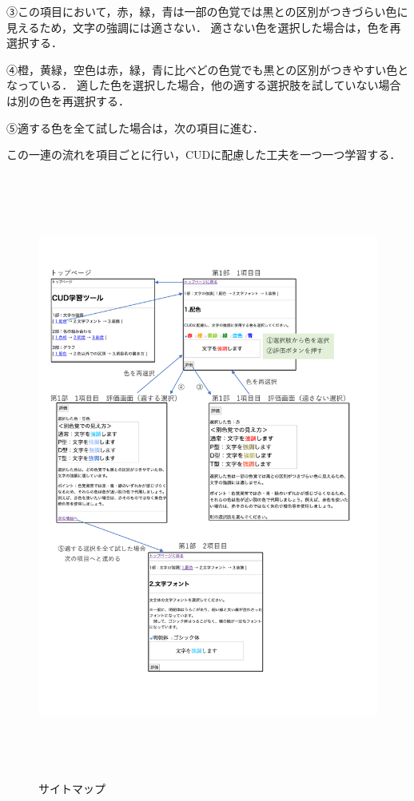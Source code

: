 ③この項目において，赤，緑，青は一部の色覚では黒との区別がつきづらい色に見えるため，文字の強調には適さない．
適さない色を選択した場合は，色を再選択する．

④橙，黄緑，空色は赤，緑，青に比べどの色覚でも黒との区別がつきやすい色となっている．
適した色を選択した場合，他の適する選択肢を試していない場合は別の色を再選択する．

⑤適する色を全て試した場合は，次の項目に進む．

この一連の流れを項目ごとに行い，CUDに配慮した工夫を一つ一つ学習する．

\begin{figure}[h]
\begin{center}
 \includegraphics[clip,height=200mm]{images/map.pdf}
\end{center}
 \caption{サイトマップ}
 \label{fig:map}
\end{figure}

